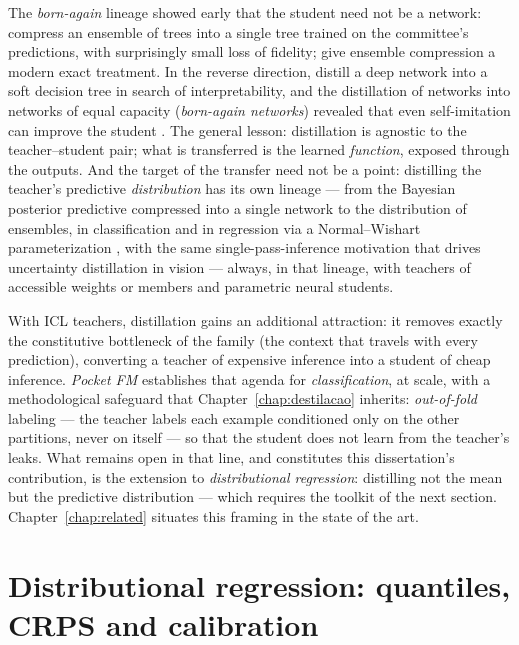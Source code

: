 The \emph{born-again} lineage showed early that the student need not
be a network: \citet{breiman1996} compress an ensemble of trees into
a single tree trained on the committee's predictions, with
surprisingly small loss of fidelity; \citet{vidal2020} give ensemble
compression a modern exact treatment. In the reverse direction,
\citet{frosst2017} distill a deep network into a soft decision tree
in search of interpretability, and the distillation of networks into
networks of equal capacity (\emph{born-again networks}) revealed
that even self-imitation can improve the student
\citep{furlanello2018}. The general lesson: distillation is
agnostic to the teacher--student pair; what is transferred is the
learned \emph{function}, exposed through the outputs. And the target
of the transfer need not be a point: distilling the teacher's
predictive \emph{distribution} has its own lineage --- from the
Bayesian posterior predictive compressed into a single network
\citep{korattikara2015} to the distribution of ensembles, in
classification \citep{malinin2020end2} and in regression via a
Normal--Wishart parameterization \citep{malinin2020rpn}, with the
same single-pass-inference motivation that drives uncertainty
distillation in vision \citep{shen2021} --- always, in that lineage,
with teachers of accessible weights or members and parametric neural
students.

With ICL teachers, distillation gains an additional attraction: it
removes exactly the constitutive bottleneck of the family (the
context that travels with every prediction), converting a teacher of
expensive inference into a student of cheap inference. \emph{Pocket
FM} \citep{pocketfm2026} establishes that agenda for
\emph{classification}, at scale, with a methodological safeguard
that Chapter~\ref{chap:destilacao} inherits: \emph{out-of-fold}
labeling --- the teacher labels each example conditioned only on the
other partitions, never on itself --- so that the student does not
learn from the teacher's leaks. What remains open in that line, and
constitutes this dissertation's contribution, is the extension to
\emph{distributional regression}: distilling not the mean but the
predictive distribution --- which requires the toolkit of the next
section. Chapter~\ref{chap:related} situates this framing in the
state of the art.

\section{Distributional regression: quantiles, CRPS and calibration}
\label{sec:fund-distribucional}


